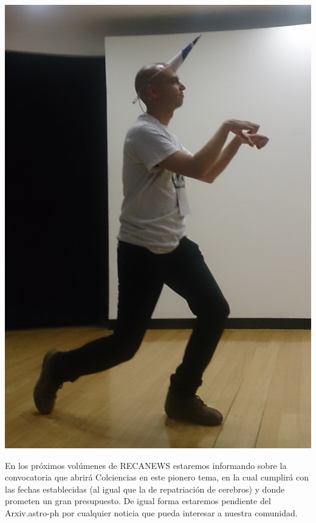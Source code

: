 \documentclass{book}
\begin{document}
\begin{center}
\includegraphics[width=.45\textwidth]{AstroUnicornistis.JPG} 
\end{center}

En los próximos volúmenes de RECANEWS estaremos informando sobre la convocatoria que abrirá Colciencias en este pionero tema, en la cual cumplirá con las fechas establecidas (al igual que la de repatriación de cerebros) y donde prometen un gran presupuesto. De igual forma estaremos pendiente del Arxiv.astro-ph por cualquier noticia que pueda interesar a nuestra comunidad. 







\end{document}
